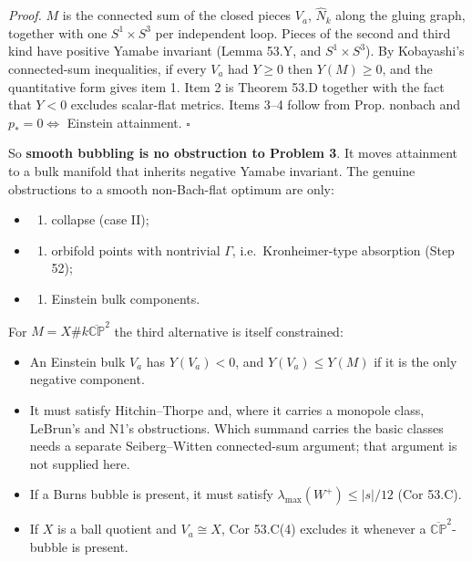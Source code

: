 \documentclass[
  10pt,
]{report}
\providecommand{\tightlist}{%
  \setlength{\itemsep}{0pt}\setlength{\parskip}{0pt}}
\begin{document}
\emph{Proof.} \(M\) is the connected sum of the closed pieces \(V_a\),
\(\widehat N_k\) along the gluing graph, together with one
\(S^1\times S^3\) per independent loop. Pieces of the second and third
kind have positive Yamabe invariant (Lemma 53.Y, and \(S^1\times S^3\)).
By Kobayashi's connected-sum inequalities, if every \(V_a\) had
\(Y\ge0\) then \(Y(M)\ge0\), and the quantitative form gives item 1.
Item 2 is Theorem 53.D together with the fact that \(Y<0\) excludes
scalar-flat metrics. Items 3--4 follow from Prop. nonbach and
\(p_*=0\iff\) Einstein attainment. \(\square\)

So \textbf{smooth bubbling is no obstruction to Problem 3}. It moves
attainment to a bulk manifold that inherits negative Yamabe invariant.
The genuine obstructions to a smooth non-Bach-flat optimum are only:

\begin{itemize}
\item
  \begin{enumerate}
  \def\labelenumi{(\alph{enumi})}
  \tightlist
  \item
    collapse (case II);
  \end{enumerate}
\item
  \begin{enumerate}
  \def\labelenumi{(\alph{enumi})}
  \setcounter{enumi}{1}
  \tightlist
  \item
    orbifold points with nontrivial \(\Gamma\), i.e.~Kronheimer-type
    absorption (Step 52);
  \end{enumerate}
\item
  \begin{enumerate}
  \def\labelenumi{(\alph{enumi})}
  \setcounter{enumi}{2}
  \tightlist
  \item
    Einstein bulk components.
  \end{enumerate}
\end{itemize}

For \(M=X\#k\overline{\mathbb{CP}}^2\) the third alternative is itself
constrained:

\begin{itemize}
\tightlist
\item
  An Einstein bulk \(V_a\) has \(Y(V_a)<0\), and \(Y(V_a)\le Y(M)\) if
  it is the only negative component.
\item
  It must satisfy Hitchin--Thorpe and, where it carries a monopole
  class, LeBrun's and N1's obstructions. Which summand carries the basic
  classes needs a separate Seiberg--Witten connected-sum argument; that
  argument is not supplied here.
\item
  If a Burns bubble is present, it must satisfy
  \(\lambda_{\max}(W^+)\le|s|/12\) (Cor 53.C).
\item
  If \(X\) is a ball quotient and \(V_a\cong X\), Cor 53.C(4) excludes
  it whenever a \(\overline{\mathbb{CP}}^2\)-bubble is present.
\end{itemize}
\end{document}
